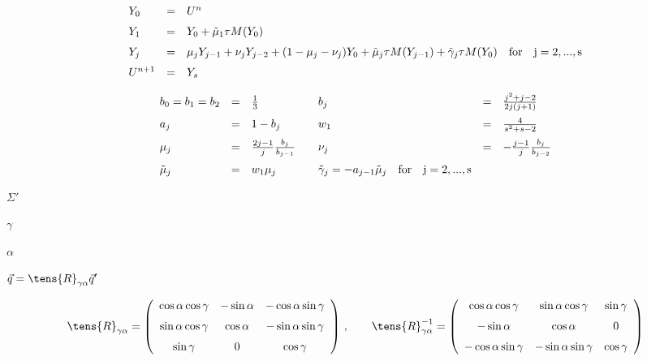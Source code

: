 \documentclass{article}
\begin{document}
\[ \begin{array}{lcl}
    Y_0 & = & U^n                            \\ \noalign{\medskip}
    Y_1 & = & Y_0 + \tilde{\mu}_1\tau M(Y_0) \\ \noalign{\medskip}
    Y_j & = & \mu_j Y_{j-1} + \nu_j Y_{j-2} + (1 - \mu_j - \nu_j) Y_0
          + \tilde{\mu}_j \tau M(Y_{j-1}) + \tilde{\gamma}_j \tau M(Y_0)
          \quad \rm{for} \quad j = 2,...,s   \\ \noalign{\medskip}
    U^{n+1} & = & Y_s
    \end{array}
\]
\pagebreak

\[ \begin{array}{lclclcl}
    b_0 = b_1 = b_2 & = & \frac{1}{3} & &
            b_j & = & \frac{j^2 + j - 2}{2j(j + 1)} \\ \noalign{\medskip}
    a_j & = & 1 - b_j & & w_1 & = & \frac{4}{s^2 + s - 2} \\ \noalign{\medskip}
    \mu_j & = & \frac{2j - 1}{j} \frac{b_j}{b_{j-1}} & &
            \nu_j & = & -\frac{j-1}{j} \frac{b_j}{b_{j-2}} \\ \noalign{\medskip}
    \tilde{\mu}_j & = & w_1 \mu_j & & \tilde{\gamma}_j = -a_{j-1}\tilde{\mu}_j
            \quad \rm{for} \quad j = 2,...,s   
    \end{array}
\]
\pagebreak

$\Sigma'$
\pagebreak

$\gamma $
\pagebreak

$\alpha$
\pagebreak

$\vec{q} = \tens{R}_{\gamma\alpha}\vec{q}'$
\pagebreak

\[
  \tens{R}_{\gamma\alpha} = \left(\begin{array}{ccc}
     \cos\alpha\cos\gamma  &   -\sin\alpha  &   -\cos\alpha\sin\gamma
     \\ \noalign{\medskip}
     \sin\alpha\cos\gamma  &    \cos\alpha  &   -\sin\alpha\sin\gamma
     \\ \noalign{\medskip}
     \sin\gamma            &       0        &   \cos\gamma
  \end{array}\right)
  \,,\qquad
  \tens{R}^{-1}_{\gamma\alpha} = \left(\begin{array}{ccc}
     \cos\alpha\cos\gamma  &  \sin\alpha\cos\gamma  &  \sin\gamma
     \\ \noalign{\medskip}
      -\sin\alpha          &   \cos\alpha           &    0
     \\ \noalign{\medskip}
     -\cos\alpha\sin\gamma &  -\sin\alpha\sin\gamma  &  \cos\gamma
    \end{array}\right)
\]
\pagebreak
\end{document}
